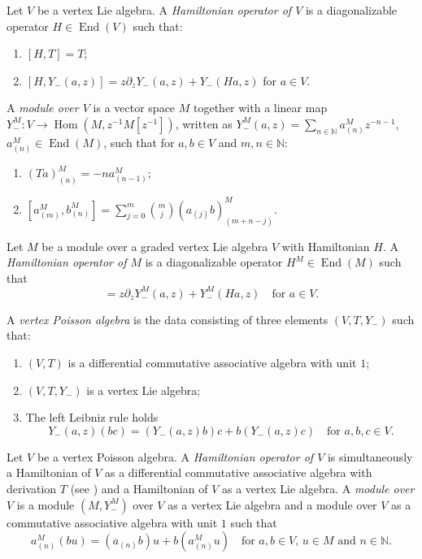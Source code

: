 \documentclass[a4paper, 12pt, reqno]{amsart}
\theoremstyle{remark}
\DeclareMathOperator{\Hom}{Hom}
\DeclareMathOperator{\End}{End}
\begin{document}
Let $V$ be a vertex Lie algebra.
A \emph{Hamiltonian operator of $V$} is a diagonalizable operator $H \in \End(V)$ such that:
\begin{enumerate}
\item $[H, T] = T$;
\item $[H, Y_-(a, z)] = z\partial_zY_-(a, z) + Y_-(Ha, z)$ for $a \in V$.
\end{enumerate}
A \emph{module over $V$} is a vector space $M$ together with a linear map $Y^M_-: V \to \Hom(M, z^{-1}M[z^{-1}])$, written as $Y^M_-(a, z) = \sum_{n \in \mathbb{N}}a^M_{(n)}z^{-n - 1}$, $a^M_{(n)} \in \End(M)$, such that for $a, b \in V$ and $m, n \in \mathbb{N}$:
\begin{enumerate}
\item $(Ta)^M_{(n)} = -na^M_{(n - 1)}$;
\item $[a^M_{(m)}, b^M_{(n)}] = \sum_{j = 0}^m\binom{m}{j}(a_{(j)}b)^M_{(m + n - j)}$.
\end{enumerate}

Let $M$ be a module over a graded vertex Lie algebra $V$ with Hamiltonian $H$.
A \emph{Hamiltonian operator of $M$} is a diagonalizable operator $H^M \in \End(M)$ such that
\begin{equation*}
  [H^M, Y^M_-(a, z)] = z\partial_zY^M_-(a, z) + Y^M_-(Ha, z) \quad \text{for $a \in V$}.
\end{equation*}

A \emph{vertex Poisson algebra} is the data consisting of three elements $(V, T, Y_-)$ such that:
\begin{enumerate}
\item $(V, T)$ is a differential commutative associative algebra with unit $1$;
\item $(V, T, Y_-)$ is a vertex Lie algebra;
\item The left Leibniz rule holds
  \begin{equation*}
    Y_-(a, z)(bc) = (Y_-(a, z)b)c + b(Y_-(a, z)c) \quad \text{for $a, b, c \in V$}.
  \end{equation*}
\end{enumerate}

Let $V$ be a vertex Poisson algebra.
A \emph{Hamiltonian operator of $V$} is simultaneously a Hamiltonian of $V$ as a differential commutative associative algebra with derivation $T$ (see ) and a Hamiltonian of $V$ as a vertex Lie algebra.
A \emph{module over $V$} is a module $(M, Y^M_-)$ over $V$ as a vertex Lie algebra and a module over $V$ as a commutative associative algebra with unit $1$ such that
\begin{equation*}
  a^M_{(n)}(bu) = (a_{(n)}b)u + b(a^M_{(n)}u) \quad \text{for $a, b \in V$, $u \in M$ and $n \in \mathbb{N}$}.
\end{equation*}
\end{document}
